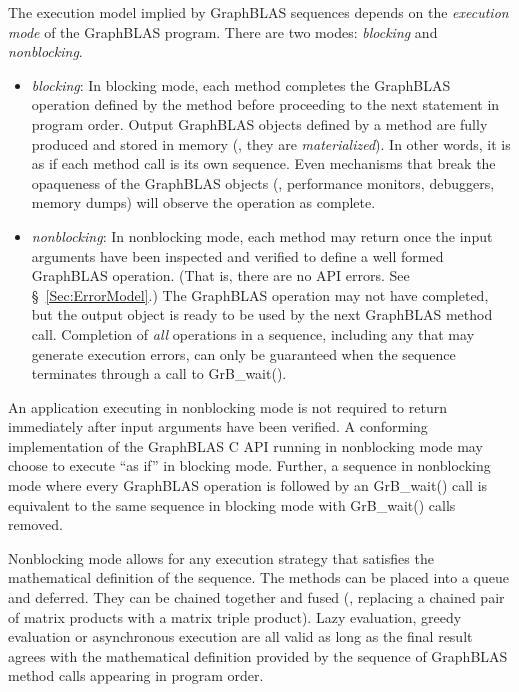 The execution model
implied by GraphBLAS sequences depends on the \emph{execution mode} of the 
GraphBLAS program.  There are two modes: \emph{blocking} and \emph{nonblocking}.  
\begin{itemize}

\item \emph{blocking}: In blocking mode, each method completes the
GraphBLAS operation defined by the method before proceeding to the
next statement in program order.  Output GraphBLAS objects defined by a
method are fully produced and stored in  memory (\ie, they are
\emph{materialized}).  In other words, it is as if each method call is its own sequence.
Even mechanisms that break the opaqueness of the
GraphBLAS objects (\eg, performance monitors, debuggers, memory dumps)
will observe the operation as complete.

\item \emph{nonblocking}: In nonblocking mode, each method may return
once the input arguments have been inspected and verified to define a
well formed GraphBLAS operation. (That is, there are no API errors. See
\S~\ref{Sec:ErrorModel}.) The GraphBLAS operation may not have completed,
but the output object is ready to be used by the next GraphBLAS method
call.  Completion of \emph{all} operations in a sequence, including any that may generate execution
errors, can only be guaranteed when the sequence terminates through a
call to {\sf GrB\_wait()}.

\end{itemize}

An application executing in nonblocking mode is not required to return
immediately after input arguments have been verified. A conforming
implementation of the GraphBLAS C API running in nonblocking mode may
choose to execute ``as if'' in blocking mode.  Further, a sequence in
nonblocking mode where every GraphBLAS operation is followed by an {\sf
GrB\_wait()} call is equivalent to the same sequence in blocking mode
with {\sf GrB\_wait()} calls removed.

Nonblocking mode allows for any execution strategy that satisfies the
mathematical definition of the sequence.  The methods can be placed
into a queue and deferred.  They can be chained together and fused
(\eg, replacing a chained pair of matrix products with a matrix triple
product).  Lazy evaluation, greedy evaluation or asynchronous execution
are all valid as long as the final result agrees with the mathematical
definition provided by the sequence of GraphBLAS method calls appearing
in  program order.

